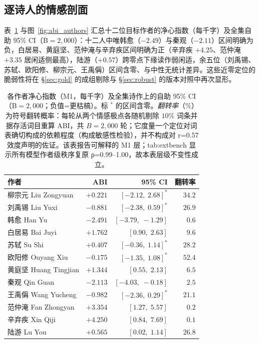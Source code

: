 \documentclass[11pt]{article}
\begin{document}
\subsection{逐诗人的情感剖面}
\label{sec:profiles:poets}
表~\ref{tab:abi} 与图~\ref{fig:abi_authors} 汇总十二位目标作者的净心指数（每千字）及全集自助 95\% CI（B$=2{,}000$）：十二人中唯韩愈（$-2.49$）与秦观（$-2.11$）区间明确为负，白居易、黄庭坚、范仲淹与辛弃疾区间明确为正（辛弃疾 $+4.25$、范仲淹 $+3.35$ 居闲适侧最高），陆游（$+0.57$）跨零点下缘读作弱闲适，余五位（刘禹锡、苏轼、欧阳修、柳宗元、王禹偁）区间含零、与中性无统计差异。这些近零定位的脆弱性将在 \S\ref{sec:gold} 的成组剔除与 \S\ref{sec:robust} 的版本对照中再次显形。

\begin{table}[H]
\centering\small
\caption{各作者净心指数（M1，每千字）及全集诗作上的自助 95\% CI（B$=2{,}000$；负值=更枯槁）。标 $^*$ 的区间含零。\emph{翻转率}（\%）为符号翻转概率：每轮从两个情感极点各随机剔除 $10\%$ 词条并据存活词目重算 ABI，共 $B{=}2{,}000$ 轮；它度量一个定位对词表确切构成的依赖程度（构成敏感性检验），并不构成对 r=0.57 效度声明的佐证。该表报告可解释的 M1 层；tab:extbench 显示所有模型作者级秩序复原 ρ=0.99–1.00，故本表层级不变性成立。}
\label{tab:abi}
\begin{tabular}{lrrr}
\toprule
作者 & ABI & 95\% CI & 翻转率\\
\midrule
柳宗元 Liu Zongyuan & $+0.221$ & $[-2.12,\;2.68]^*$ & $34.2$\\
刘禹锡 Liu Yuxi & $-0.881$ & $[-2.38,\;0.59]^*$ & $26.9$\\
韩愈 Han Yu & $-2.491$ & $[-3.79,\;-1.29]$ & $0.6$\\
白居易 Bai Juyi & $+1.762$ & $[0.90,\;2.63]$ & $9.6$\\
苏轼 Su Shi & $+0.407$ & $[-0.36,\;1.14]^*$ & $28.2$\\
欧阳修 Ouyang Xiu & $-0.175$ & $[-1.35,\;1.08]^*$ & $52.4$\\
黄庭坚 Huang Tingjian & $+1.344$ & $[0.55,\;2.13]$ & $6.5$\\
秦观 Qin Guan & $-2.113$ & $[-4.03,\;-0.18]$ & $2.5$\\
王禹偁 Wang Yucheng & $-0.982$ & $[-2.36,\;0.29]^*$ & $21.1$\\
范仲淹 Fan Zhongyan & $+3.354$ & $[1.27,\;5.57]$ & $0.2$\\
辛弃疾 Xin Qiji & $+4.250$ & $[0.84,\;7.69]$ & $0.1$\\
陆游 Lu You & $+0.565$ & $[0.02,\;1.14]$ & $26.8$\\
\bottomrule
\end{tabular}
\end{table}
\end{document}
